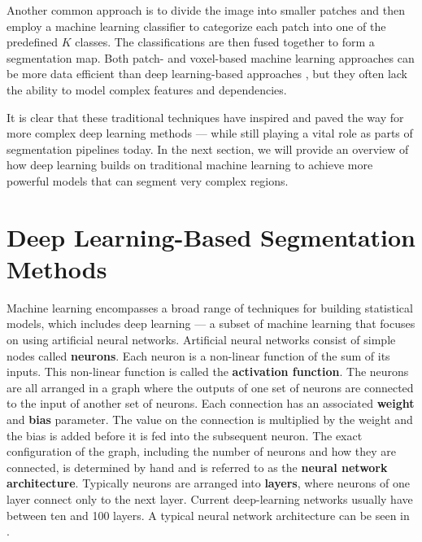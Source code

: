 Another common approach is to divide the image into smaller patches and then employ a machine learning classifier to categorize each patch into one of the predefined $K$ classes. The classifications are then fused together to form a segmentation map. Both patch- and voxel-based machine learning approaches can be more data efficient than deep learning-based approaches \cite{bencevicRecentProgressEpicardial2022}, but they often lack the ability to model complex features and dependencies. 

It is clear that these traditional techniques have inspired and paved the way for more complex deep learning methods --- while still playing a vital role as parts of segmentation pipelines today. In the next section, we will provide an overview of how deep learning builds on traditional machine learning to achieve more powerful models that can segment very complex regions.

\pagebreak

\section{Deep Learning-Based Segmentation Methods}

Machine learning encompasses a broad range of techniques for building statistical models, which includes deep learning --- a subset of machine learning that focuses on using artificial neural networks. Artificial neural networks consist of simple nodes called \textbf{neurons}. Each neuron is a non-linear function of the sum of its inputs. This non-linear function is called the \textbf{activation function}. The neurons are all arranged in a graph where the outputs of one set of neurons are connected to the input of another set of neurons. Each connection has an associated \textbf{weight} and \textbf{bias} parameter. The value on the connection is multiplied by the weight and the bias is added before it is fed into the subsequent neuron. The exact configuration of the graph, including the number of neurons and how they are connected, is determined by hand and is referred to as the \textbf{neural network architecture}. Typically neurons are arranged into \textbf{layers}, where neurons of one layer connect only to the next layer. Current deep-learning networks usually have between ten and 100 layers. A typical neural network architecture can be seen in .

